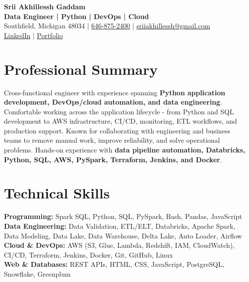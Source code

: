 \documentclass[letterpaper,10pt]{article}
\begin{document}
\fontsize{9.35pt}{10.45pt}\selectfont

\begin{center}
    {\LARGE \textbf{Srii Akhillessh Gaddam}} \\[-1pt]
    \textbf{Data Engineer | Python | DevOps | Cloud} \\[2pt]
    Southfield, Michigan 48034 $|$
    \href{tel:6468752400}{646-875-2400} $|$
    \href{mailto:sriiakhillessh@gmail.com}{sriiakhillessh@gmail.com} \\[1pt]
    \href{https://www.linkedin.com/in/srii-akhiilessh-gaddam-b48668191/}{LinkedIn} $|$
    \href{https://sriiakhillesshg.github.io/portfolio/}{Portfolio}
\end{center}
\vspace{-8pt}

\section{Professional Summary}
\small{Cross-functional engineer with experience spanning \textbf{Python application development, DevOps/cloud automation, and data engineering}. Comfortable working across the application lifecycle - from Python and SQL development to AWS infrastructure, CI/CD, monitoring, ETL workflows, and production support. Known for collaborating with engineering and business teams to remove manual work, improve reliability, and solve operational problems. Hands-on experience with \textbf{data pipeline automation, Databricks, Python, SQL, AWS, PySpark, Terraform, Jenkins, and Docker}.}

\section{Technical Skills}
\small{
\textbf{Programming:} Spark SQL, Python, SQL, PySpark, Bash, Pandas, JavaScript \\
\textbf{Data Engineering:} Data Validation, ETL/ELT, Databricks, Apache Spark, Data Modeling, Data Lake, Data Warehouse, Delta Lake, Auto Loader, Airflow \\
\textbf{Cloud \& DevOps:} AWS (S3, Glue, Lambda, Redshift, IAM, CloudWatch), CI/CD, Terraform, Jenkins, Docker, Git, GitHub, Linux \\
\textbf{Web \& Databases:} REST APIs, HTML, CSS, JavaScript, PostgreSQL, Snowflake, Greenplum
}
\end{document}

